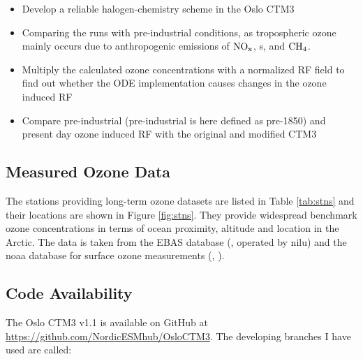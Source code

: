\begin{itemize}
    \item Develop a reliable halogen-chemistry scheme in the Oslo CTM3
    \item Comparing the runs with pre-industrial conditions, as tropospheric ozone mainly occurs due to anthropogenic emissions of $\mathrm{NO_x}$, s,  and $\mathrm{CH_4}$.
    \item Multiply the calculated ozone concentrations with a normalized RF field to find out whether the ODE implementation causes changes in the ozone induced RF
    \item Compare pre-industrial (pre-industrial is here defined as pre-1850) and present day ozone induced RF with the original and modified CTM3
\end{itemize}

\subsection{Measured Ozone Data}

The stations providing long-term ozone datasets are listed in Table \ref{tab:stns} and their locations are shown in Figure \ref{fig:stns}. They provide widespread benchmark ozone concentrations in terms of ocean proximity, altitude and location in the Arctic. The data is taken from the EBAS database (\cite{EBAS}, operated by \acrfull{nilu}) and the \acrfull{noaa} database for surface ozone measurements (\cite{NOAA}, \cite{McClure_Begley_NOAA}).




\subsection{Code Availability}\label{sec:code_availability}

The Oslo CTM3 v1.1 is available on GitHub at \url{https://github.com/NordicESMhub/OsloCTM3}. The developing branches I have used are called:


